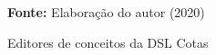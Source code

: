 \begin{figure}[ht!]
\centering

\caption{\textmd{Editores de conceitos da DSL Cotas}}
\label{fig:editors}

\par\medskip\textbf{Fonte:} Elaboração do autor (2020) \par\medskip

\end{figure}

